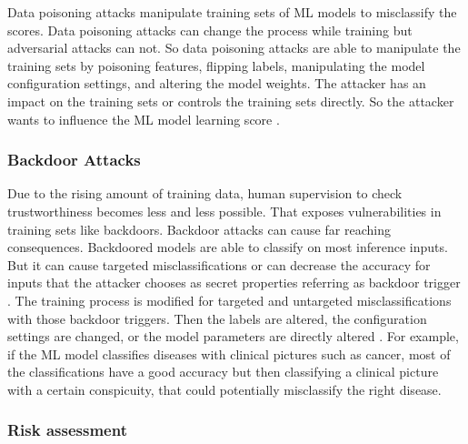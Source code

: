 Data poisoning attacks manipulate training sets of ML models to misclassify the scores. Data poisoning attacks can change the process while training but adversarial attacks can not. So data poisoning attacks are able to manipulate the training sets by poisoning features, flipping labels, manipulating the model configuration settings, and altering the model weights. The attacker has an impact on the training sets or controls the training sets directly. So the attacker wants to influence the ML model learning score \cite{DBLP:journals/corr/abs-2112-02797}.

\subsubsection*{Backdoor Attacks}
\label{sec:backdoor}

Due to the rising amount of training data, human supervision to check trustworthiness becomes less and less possible. That exposes vulnerabilities in training sets like backdoors. Backdoor attacks
can cause far reaching consequences. Backdoored models are able to classify on most inference inputs. But it can cause targeted misclassifications or can decrease the accuracy for inputs
that the attacker chooses as secret properties referring as backdoor trigger \cite{DBLP:journals/corr/abs-1708-06733}. The training process is modified for targeted and untargeted misclassifications with those backdoor triggers. Then the labels are altered, the configuration settings are changed, or the model parameters are directly altered \cite{DBLP:journals/corr/abs-2112-02797}. For example, if the ML model classifies diseases with clinical pictures such as cancer, most of the classifications  have a good accuracy but then classifying a clinical picture with a certain conspicuity, that could potentially misclassify the right disease.

\subsubsection*{Risk assessment}

